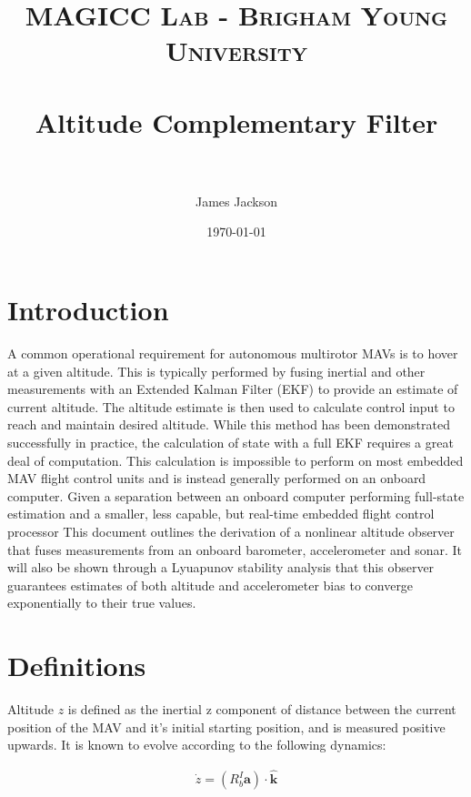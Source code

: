 \documentclass[paper=a4, fontsize=11pt]{scrartcl} %
\title{
\normalfont \normalsize
\textsc{MAGICC Lab - Brigham Young University} \\ [25pt] %
\horrule{0.5pt} \\[0.4cm] %
\huge Altitude Complementary Filter \\ %
\horrule{2pt} \\[0.5cm] %
}
\author{James Jackson} %
\date{\normalsize\today} %
\numberwithin{equation}{section} %
\numberwithin{figure}{section} %
\numberwithin{table}{section} %
\begin{document}
\maketitle %

\section{Introduction}

A common operational requirement for autonomous multirotor MAVs is to hover at a given altitude.  
This is typically performed by fusing inertial and other measurements with an Extended Kalman Filter (EKF) to provide an estimate of current altitude.  
The altitude estimate is then used to calculate control input to reach and maintain desired altitude.  
While this method has been demonstrated successfully in practice, the calculation of  state with a full EKF requires a great deal of computation.
This calculation is impossible to perform on most embedded MAV flight control units and is instead generally performed on an onboard computer.
Given a separation between an onboard computer performing full-state estimation and a smaller, less capable, but real-time embedded flight control processor
This document outlines the derivation of a nonlinear altitude observer that fuses measurements from an onboard barometer, accelerometer and sonar.
It will also be shown through a Lyuapunov stability analysis that this observer guarantees estimates of both altitude and accelerometer bias to converge exponentially to their true values.


\section{Definitions}

\newcommand{\zhat}{\hat{z}}
\newcommand{\z}{z}
\newcommand{\zdot}{\dot{z}}
\newcommand{\acc}{\bm{a}}
\newcommand{\ameas}{\bm{a}_{meas}}
\newcommand{\khat}{\hat{\bm{k}}}
\newcommand{\RbI}{R_b^I}
\newcommand{\RIb}{R_I^b}

Altitude $\z$ is defined as the inertial z component of distance between the current position of the MAV and it's initial starting position, and is measured positive upwards. It is known to evolve according to the following dynamics:

\begin{equation}
	\begin{aligned}
		\zdot = \left( \RbI \acc \right) \cdot \khat
	\end{aligned}
\end{equation}
\end{document}
